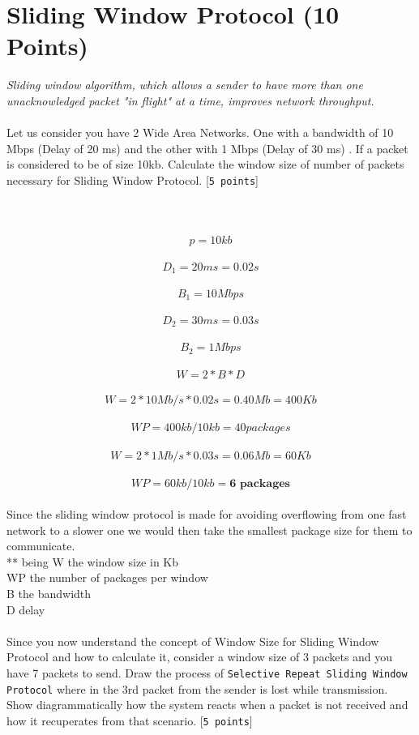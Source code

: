 \documentclass{WeSTassignment}
\begin{document}
\section{Sliding Window Protocol (10 Points)}
\emph{Sliding window algorithm, which allows a sender to have more than one unacknowledged packet "in flight" at a time, improves network throughput. }\\ \\
Let us consider you have 2 Wide Area Networks. One with a bandwidth of 10 Mbps (Delay of 20 ms) and the other with 1 Mbps (Delay of 30 ms) . If a packet is considered to be of size 10kb. Calculate the window size of number of packets necessary for Sliding Window Protocol. [\texttt{5 points}]\\ \\
\\ \\
\[p   = 10kb\]\\
\[D_1= 20ms = 0.02s\]\\
\[B_1 = 10Mbps\]\\
\[D_2= 30ms = 0.03s\]\\
\[B_2 = 1Mbps\]\\
\[W = 2*B*D\]\\
\[W = 2 * 10Mb/s * 0.02s = 0.40Mb = 400Kb\]\\
\[WP = 400kb / 10kb = 40 packages\]\\
\[W = 2 * 1Mb/s * 0.03s = 0.06Mb = 60Kb\]\\
\[WP = 60kb / 10kb = \textbf{6 packages}\] \\

Since the sliding window protocol is made for avoiding overflowing from one fast network to a slower one we would then take the smallest package size for them to communicate.\\

** being W the window size in Kb\\ WP the number of packages per window\\ B the bandwidth\\ D delay\\\\
Since you now understand the concept of Window Size for Sliding Window Protocol and how to calculate it, consider a window size of 3 packets and you have 7 packets to send. Draw the process of \texttt{Selective Repeat Sliding Window Protocol} where in the 3rd packet from the sender is lost while transmission. Show diagrammatically how the system reacts when a packet is not received and how it recuperates from that scenario. [\texttt{5 points}] \\
\end{document}
